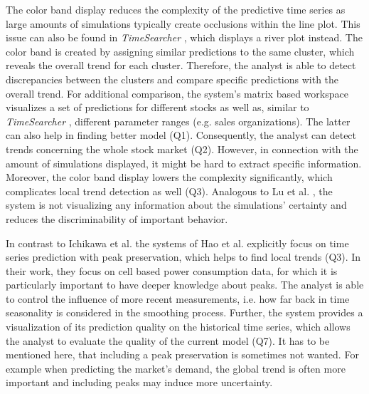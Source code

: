 \documentclass[electronic]{vgtc}             %
\begin{document}
The color band display reduces the complexity of the predictive time series as large amounts of simulations typically create occlusions within the line plot.
This issue can also be found in \textit{TimeSearcher} \cite{buono:2007}, which displays a river plot instead.
The color band is created by assigning similar predictions to the same cluster, which reveals the overall trend for each cluster.
Therefore, the analyst is able to detect discrepancies between the clusters and compare specific predictions with the overall trend. 
For additional comparison, the system's matrix based workspace visualizes a set of predictions for different stocks as well as, similar to \textit{TimeSearcher} \cite{buono:2007}, different parameter ranges (e.g. sales organizations). 
The latter can also help in finding better model (Q1).
Consequently, the analyst can detect trends concerning the whole stock market (Q2).  
However, in connection with the amount of simulations displayed, it might be hard to extract specific information.
Moreover, the color band display lowers the complexity significantly, which complicates local trend detection as well (Q3).
Analogous to Lu et al. \cite{lu:2014}, the system is not visualizing any information about the simulations' certainty and reduces the discriminability of important behavior. 

In contrast to Ichikawa et al.\cite{ichikawa:2002} the systems of Hao et al. \cite{Hao:2011, Hao:2009} explicitly focus on time series prediction with peak preservation, which helps to find local trends (Q3).
In their work, they focus on cell based power consumption data, for which it is particularly important to have deeper knowledge about peaks.
The analyst is able to control the influence of more recent measurements, i.e. how far back in time seasonality is considered in the smoothing process. 
Further, the system provides a visualization of its prediction quality on the historical time series, which allows the analyst to evaluate the quality of the current model (Q7). 
It has to be mentioned here, that including a peak preservation is sometimes not wanted.
For example when predicting the market's demand, the global trend is often more important and including peaks may induce more uncertainty. 
\end{document}
